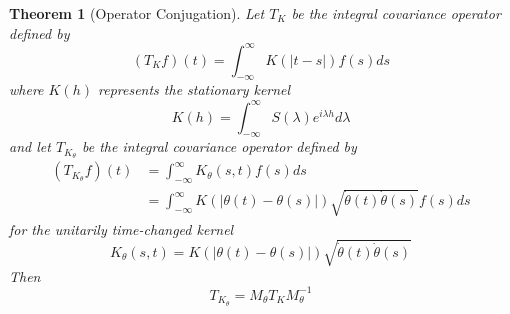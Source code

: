 \documentclass{article}
\newtheorem{theorem}{Theorem}
\begin{document}
\begin{theorem}
  [Operator Conjugation]\label{thm:operator_conjugation} Let $T_K$ be the
  integral covariance operator defined by
  \begin{equation}
    \label{eq:integral_op_original} (T_K f) (t) = \int_{- \infty}^{\infty} K
    (|t - s|) f (s) ds
  \end{equation}
  where $K (h)$ represents the stationary kernel
  \begin{equation}
    K (h) = \int_{- \infty}^{\infty} S (\lambda) e^{i \lambda h} d \lambda
  \end{equation}
  and let $T_{K_{\theta}}$ be the integral covariance operator defined by
  \begin{equation}
    \begin{array}{ll}
      (T_{K_{\theta}} f) (t) & = \int_{- \infty}^{\infty} K_{\theta} (s, t) f
      (s) ds\\
      & = \int_{- \infty}^{\infty} K (| \theta (t) - \theta (s) |)
      \sqrt{\dot{\theta} (t)  \dot{\theta} (s)} f (s) ds
    \end{array} \label{eq:integral_op_transformed}
  \end{equation}
  for the unitarily time-changed kernel
  \begin{equation}
    K_{\theta} (s, t) = K (| \theta (t) - \theta (s) |) \sqrt{\dot{\theta} (t)
    \dot{\theta} (s)}
  \end{equation}
  Then
  \begin{equation}
    \label{eq:conjugation} T_{K_{\theta}} = M_{\theta} T_K M_{\theta}^{- 1}
  \end{equation}
\end{theorem}
\end{document}

